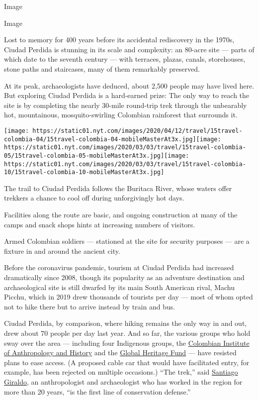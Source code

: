 Image

Image

Lost to memory for 400 years before its accidental rediscovery in the
1970s, Ciudad Perdida is stunning in its scale and complexity: an
80-acre site --- parts of which date to the seventh century --- with
terraces, plazas, canals, storehouses, stone paths and staircases, many
of them remarkably preserved.

At its peak, archaeologists have deduced, about 2,500 people may have
lived here. But exploring Ciudad Perdida is a hard-earned prize: The
only way to reach the site is by completing the nearly 30-mile
round-trip trek through the unbearably hot, mountainous,
mosquito-swirling Colombian rainforest that surrounds it.

\texttt{[image: https://static01.nyt.com/images/2020/04/12/travel/15travel-colombia-04/15travel-colombia-04-mobileMasterAt3x.jpg]}\texttt{[image: https://static01.nyt.com/images/2020/03/03/travel/15travel-colombia-05/15travel-colombia-05-mobileMasterAt3x.jpg]}\texttt{[image: https://static01.nyt.com/images/2020/03/03/travel/15travel-colombia-10/15travel-colombia-10-mobileMasterAt3x.jpg]}

The trail to Ciudad Perdida follows the Buritaca River, whose waters
offer trekkers a chance to cool off during unforgivingly hot days.

Facilities along the route are basic, and ongoing construction at many
of the camps and snack shops hints at increasing numbers of visitors.

Armed Colombian soldiers --- stationed at the site for security purposes
--- are a fixture in and around the ancient city.

Before the coronavirus pandemic, tourism at Ciudad Perdida had increased
dramatically since 2008, though its popularity as an adventure
destination and archaeological site is still dwarfed by its main South
American rival, Machu Picchu, which in 2019 drew thousands of tourists
per day --- most of whom opted not to hike there but to arrive instead
by train and bus.

Ciudad Perdida, by comparison, where hiking remains the only way in and
out, drew about 70 people per day last year. And so far, the various
groups who hold sway over the area --- including four Indigenous groups,
the \href{https://www.icanh.gov.co/}{Colombian Institute of Anthropology
and History} and the
\href{https://globalheritagefund.org/what-we-do/projects-and-programs/ciudad-perdida/}{Global
Heritage Fund} --- have resisted plans to ease access. (A proposed cable
car that would have facilitated entry, for example, has been rejected on
multiple occasions.) ``The trek,'' said
\href{https://thecitypaperbogota.com/features/giraldo-living-among-ruins/8199}{Santiago
Giraldo}, an anthropologist and archaeologist who has worked in the
region for more than 20 years, ``is the first line of conservation
defense.''

